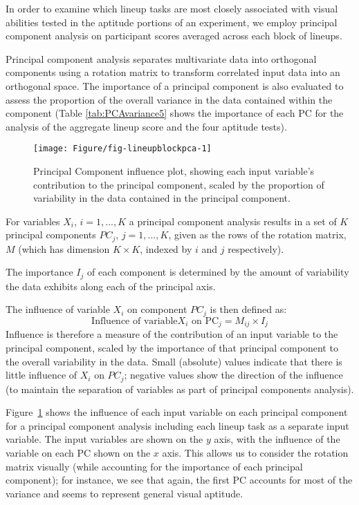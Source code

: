 \documentclass[journal]{vgtc}\usepackage[]{graphicx}\usepackage[]{color}
\begin{document}
In order to examine which lineup tasks are most closely associated with visual abilities tested in the aptitude portions of an experiment, we employ principal component analysis on participant scores averaged across each block of lineups.

Principal component analysis separates multivariate data into orthogonal components using a rotation matrix to transform correlated input data into an orthogonal space. The importance of a principal component is also evaluated to assess the proportion of the overall variance in the data contained within the component (Table \ref{tab:PCAvariance5} shows the importance of each PC for the analysis of the aggregate lineup score and the four aptitude tests). 


\begin{figure}[ht]
\texttt{[image: Figure/fig-lineupblockpca-1]}
\caption{Principal Component influence plot, showing each input variable's contribution to the principal component, scaled by the proportion of variability in the data contained in the principal component.\label{fig:influence}}
\end{figure}

For variables $X_i$, $i=1, ..., K$ a principal component analysis results in a set of $K$ principal  components $PC_j$, $j=1, ..., K$, given as the rows of the rotation matrix, $M$ (which has dimension $K\times K$, indexed by $i$ and $j$ respectively).

The importance $I_j$ of each component is determined by the amount of variability the data exhibits along each of the principal axis.

The influence of variable $X_i$ on component $PC_j$ is then defined as:
%
$$\text{Influence of variable} X_i \text{ on PC}_j = M_{ij}\times I_j$$
%
Influence is therefore a measure of the contribution of an input variable to the principal component, scaled by the importance of that principal component to the overall variability in the data. Small (absolute) values indicate that there is little influence of $X_i$ on $PC_j$; negative values show the direction of the influence (to maintain the separation of variables as part of principal components analysis). 

Figure~\ref{fig:influence} shows the influence of each input variable on each principal component for a principal component analysis  including each lineup task as a separate input variable. The input variables are shown on the $y$ axis, with the influence of the variable on each PC shown on the $x$ axis. This allows us to consider the rotation matrix visually (while accounting for the importance of each principal component); for instance, we see that again, the first PC accounts for most of the variance and seems to represent general visual aptitude. 
\end{document}

